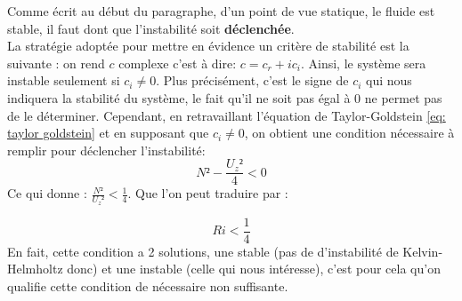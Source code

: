 \documentclass{rapportECC}
\begin{document}
Comme écrit au début du paragraphe, d'un point de vue statique, le fluide est stable, il faut dont que l'instabilité soit \textbf{déclenchée}. \\

La stratégie adoptée pour mettre en évidence un critère de stabilité est la suivante : on rend $c$ complexe c'est à dire: $c = c_r + ic_i $. Ainsi, le système sera instable seulement si $c_i \neq 0$. Plus précisément, c'est le signe de $c_i$ qui nous indiquera la stabilité du système, le fait qu'il ne soit pas égal à 0 ne permet pas de le déterminer. Cependant, en retravaillant l'équation de Taylor-Goldstein \eqref{eq: taylor goldstein} et en supposant que $c_i \neq 0$, on obtient une condition nécessaire à remplir pour déclencher l'instabilité:
\begin{equation}
    N² - \frac{U_{z}²}{4} < 0
\end{equation}
Ce qui donne : $\frac{N²}{U_{z}²} < \frac{1}{4}$. 
Que l'on peut traduire par :

\begin{equation}
    Ri < \frac{1}{4}
\end{equation}
En fait, cette condition a 2 solutions, une stable (pas de d'instabilité de Kelvin-Helmholtz donc) et une instable (celle qui nous intéresse), c'est pour cela qu'on qualifie cette condition de nécessaire non suffisante.

 \\
\end{document}
